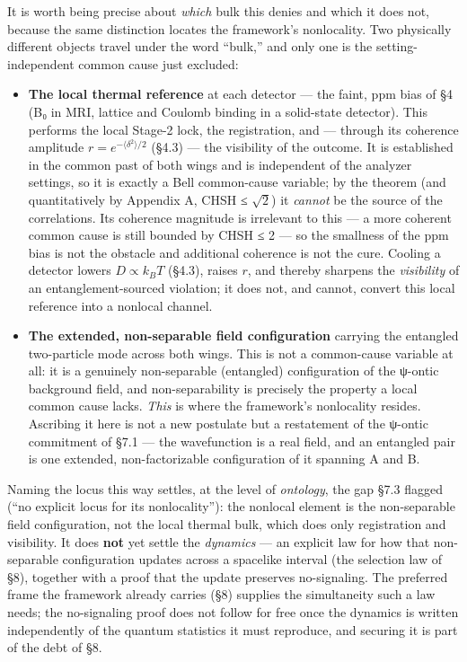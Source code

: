 \documentclass[
]{article}
\providecommand{\tightlist}{%
  \setlength{\itemsep}{0pt}\setlength{\parskip}{0pt}}
\begin{document}
It is worth being precise about \emph{which} bulk this denies and which
it does not, because the same distinction locates the framework's
nonlocality. Two physically different objects travel under the word
``bulk,'' and only one is the setting-independent common cause just
excluded:

\begin{itemize}
\tightlist
\item
  \textbf{The local thermal reference} at each detector --- the faint,
  ppm bias of §4 (B₀ in MRI, lattice and Coulomb binding in a
  solid-state detector). This performs the local Stage-2 lock, the
  registration, and --- through its coherence amplitude
  \(r = e^{-\langle\delta^2\rangle/2}\) (§4.3) --- the visibility of the
  outcome. It is established in the common past of both wings and is
  independent of the analyzer settings, so it is exactly a Bell
  common-cause variable; by the theorem (and quantitatively by Appendix
  A, CHSH ≤ \(\sqrt{2}\)) it \emph{cannot} be the source of the
  correlations. Its coherence magnitude is irrelevant to this --- a more
  coherent common cause is still bounded by CHSH ≤ 2 --- so the
  smallness of the ppm bias is not the obstacle and additional coherence
  is not the cure. Cooling a detector lowers \(D \propto k_BT\) (§4.3),
  raises \(r\), and thereby sharpens the \emph{visibility} of an
  entanglement-sourced violation; it does not, and cannot, convert this
  local reference into a nonlocal channel.
\item
  \textbf{The extended, non-separable field configuration} carrying the
  entangled two-particle mode across both wings. This is not a
  common-cause variable at all: it is a genuinely non-separable
  (entangled) configuration of the ψ-ontic background field, and
  non-separability is precisely the property a local common cause lacks.
  \emph{This} is where the framework's nonlocality resides. Ascribing it
  here is not a new postulate but a restatement of the ψ-ontic
  commitment of §7.1 --- the wavefunction is a real field, and an
  entangled pair is one extended, non-factorizable configuration of it
  spanning A and B.
\end{itemize}

Naming the locus this way settles, at the level of \emph{ontology}, the
gap §7.3 flagged (``no explicit locus for its nonlocality''): the
nonlocal element is the non-separable field configuration, not the local
thermal bulk, which does only registration and visibility. It does
\textbf{not} yet settle the \emph{dynamics} --- an explicit law for how
that non-separable configuration updates across a spacelike interval
(the selection law of §8), together with a proof that the update
preserves no-signaling. The preferred frame the framework already
carries (§8) supplies the simultaneity such a law needs; the
no-signaling proof does not follow for free once the dynamics is written
independently of the quantum statistics it must reproduce, and securing
it is part of the debt of §8.
\end{document}
